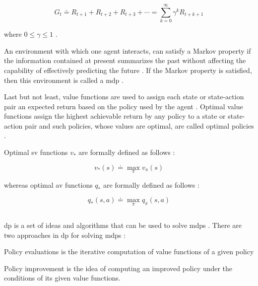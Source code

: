 \begin{equation}
\label{eq:expected_discounted_return}
	G_t  \doteq R_{t+1} + R_{t+2} + R_{t+3} + \cdots = \sum_{k=0}^\infty \gamma^k R_{t+k+1}
\end{equation}

where $0 \leq \gamma \leq 1$ \citep[p. 73]{Sutton2017}.

An environment  with which one agent interacts, can satisfy a Markov property if the information contained at present summarizes the past without affecting the capability of effectively predicting the future \citep[p. 73]{Sutton2017}. If the Markov property is satisfied, then this environment is called a \gls{mdp} \citep[p. 73]{Sutton2017}.

Last but not least, value functions are used to assign each state or state-action pair an expected return based on the policy used by the agent \citep[p. 74]{Sutton2017}. Optimal value functions assign the highest achievable return by any policy to a state or state-action pair  and such policies, whose values are optimal, are called optimal policies \citep[p. 74]{Sutton2017}.

Optimal \gls{sv} functions $v_*$ are formally defined as follows \citep[p. 74]{Sutton2017}:

\begin{equation}
	v_* (s) \doteq \max_\pi v_\pi (s)
\end{equation}

whereas optimal \gls{av} functions $q_*$ are formally defined as follows \citep[p. 74]{Sutton2017}:

\begin{equation}
	q_* (s,a) \doteq \max_\pi q_\pi (s,a)
\end{equation}

\subsection{}
\label{subsec:dp}

\gls{dp} is a set of ideas and algorithms that can be used to solve \glspl{mdp} \citep[p. 95]{Sutton2017}. There are two approaches in \gls{dp} for solving \glspl{mdp} \citep[p. 95]{Sutton2017}:
\begin{enumerate*}
	\item Policy evaluations is the iterative computation of value functions of a given policy
	\item Policy improvement is the idea of computing an improved policy under the conditions of its given value functions.
\end{enumerate*}


